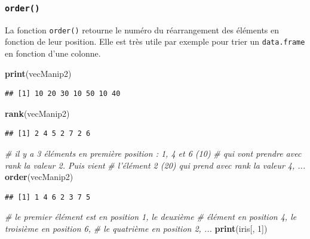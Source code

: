 \documentclass[
]{book}
\newenvironment{Shaded}{\begin{snugshade}}{\end{snugshade}}
\newcommand{\CommentTok}[1]{\textcolor[rgb]{0.56,0.35,0.01}{\textit{#1}}}
\newcommand{\DecValTok}[1]{\textcolor[rgb]{0.00,0.00,0.81}{#1}}
\newcommand{\KeywordTok}[1]{\textcolor[rgb]{0.13,0.29,0.53}{\textbf{#1}}}
\newcommand{\NormalTok}[1]{#1}
\begin{document}
\hypertarget{l015order}{%
\subsubsection{\texorpdfstring{\texttt{order()}}{order()}}\label{l015order}}

La fonction \texttt{order()} retourne le numéro du réarrangement des éléments en fonction de leur position. Elle est très utile par exemple pour trier un \texttt{data.frame} en fonction d'une colonne.

\begin{Shaded}
\begin{Highlighting}[]
\KeywordTok{print}\NormalTok{(vecManip2)}
\end{Highlighting}
\end{Shaded}

\begin{verbatim}
## [1] 10 20 30 10 50 10 40
\end{verbatim}

\begin{Shaded}
\begin{Highlighting}[]
\KeywordTok{rank}\NormalTok{(vecManip2)}
\end{Highlighting}
\end{Shaded}

\begin{verbatim}
## [1] 2 4 5 2 7 2 6
\end{verbatim}

\begin{Shaded}
\begin{Highlighting}[]
\CommentTok{# il y a 3 éléments en première position : 1, 4 et 6 (10)}
\CommentTok{# qui vont prendre avec rank la valeur 2. Puis vient}
\CommentTok{# l'élément 2 (20) qui prend avec rank la valeur 4, ...}
\KeywordTok{order}\NormalTok{(vecManip2)}
\end{Highlighting}
\end{Shaded}

\begin{verbatim}
## [1] 1 4 6 2 3 7 5
\end{verbatim}

\begin{Shaded}
\begin{Highlighting}[]
\CommentTok{# le premier élément est en position 1, le deuxième}
\CommentTok{# élément en position 4, le troisième en position 6, }
\CommentTok{# le quatrième en position 2, ...}
\KeywordTok{print}\NormalTok{(iris[, }\DecValTok{1}\NormalTok{])}
\end{Highlighting}
\end{Shaded}
\end{document}
